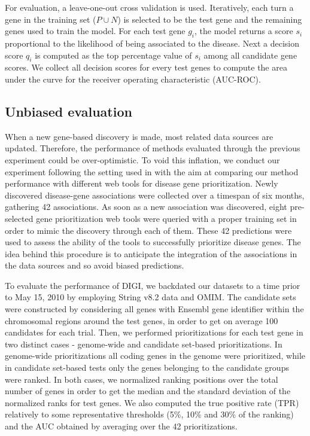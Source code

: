 For evaluation, a leave-one-out cross validation is used. Iteratively, each turn a gene in the training set ($P \cup N$) is selected to be the test gene and the remaining genes used to train the model. For each test gene $g_i$, the model returns a score $s_i$ proportional to the likelihood of being associated to the disease. Next a decision score $q_i$ is
computed as the top percentage value of $s_i$ among all candidate gene scores.
We collect all decision scores for every test genes to compute the area under
the curve for the receiver operating characteristic (AUC-ROC).

\subsection*{Unbiased evaluation} When a new gene-based discovery is made, most related data sources are updated. Therefore, the performance of methods evaluated through the previous experiment could be over-optimistic. To void this inflation, we conduct our experiment following the setting used in \cite{unbiased_evaluation} with the aim at comparing our method performance with different web tools for disease gene prioritization.
Newly discovered disease-gene associations were collected over a timespan of six months, gathering 42 associations. As soon as a new association was discovered, eight pre-selected gene prioritization web tools were queried with a proper training set in order to mimic the discovery through each of them. These 42 predictions were used to assess the ability of the tools to successfully prioritize disease genes. The idea behind this procedure is to anticipate the integration of the associations in the data sources and so avoid biased predictions.

To evaluate the performance of DIGI, we backdated our datasets to a time prior to May 15, 2010 by employing String v8.2 data \cite{string} and OMIM. The candidate sets were constructed by considering all genes with Ensembl \cite{ensembl} gene identifier within the chromosomal regions around the test genes, in order to get on average 100 candidates for each trial. Then, we performed prioritizations for each test gene in two distinct cases - genome-wide and candidate set-based prioritizations. In genome-wide prioritizations all coding genes in the genome were prioritized, while in candidate set-based tests only the genes belonging to the candidate groups were ranked. In both cases, we normalized ranking positions over the total number of genes in order to get the median and the standard deviation of the normalized ranks for test genes. We also computed the true positive rate (TPR) relatively to some representative thresholds (5\%, 10\% and 30\% of the ranking) and the AUC obtained by averaging over the 42 prioritizations.


